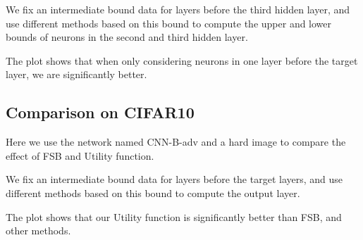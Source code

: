 We fix an intermediate bound data for layers before the third hidden layer, and use different methods based on this bound to compute the upper and lower bounds of neurons in the second and third hidden layer.

The plot shows that when only considering neurons in one layer before the target layer, we are significantly better.


\subsection*{Comparison on CIFAR10}

Here we use the network named CNN-B-adv and a hard image to compare the effect of FSB and Utility function. 

We fix an intermediate bound data for layers before the target layers, and use different methods based on this bound to compute the output layer.

The plot shows that our Utility function is significantly better than FSB, and other methods.

